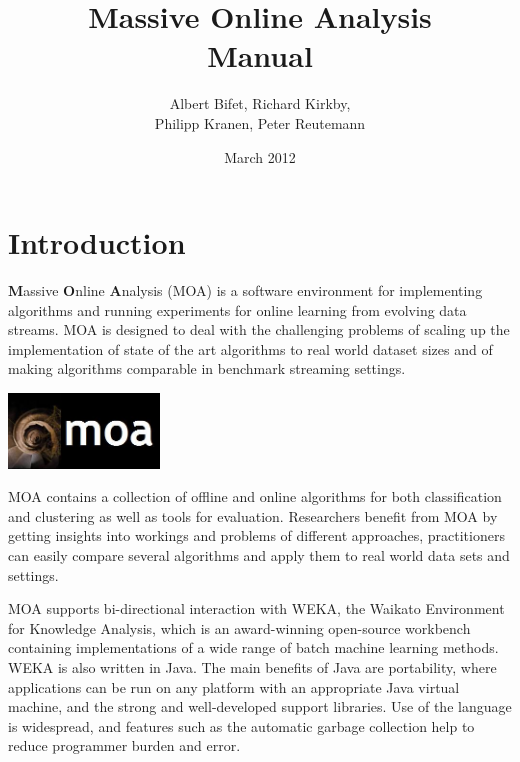 \documentclass[a4paper,12pt,twoside]{book}
\title{
\textbf{Massive Online Analysis}  \\ 
Manual
}
\author{Albert Bifet, Richard Kirkby, \\Philipp Kranen, Peter Reutemann }
\date{March 2012 }%
\begin{document}
\lstset{language=Java,basicstyle=\tiny,numbers=left}

\maketitle
{}
\thispagestyle{empty}
\cleardoublepage
\thispagestyle{empty}
\tableofcontents
\cleardoublepage
{}

\chapter{Introduction}

{\bf M}assive {\bf O}nline {\bf A}nalysis (MOA) 
is a software environment for implementing algorithms and running experiments for online learning from evolving data streams. 
MOA is designed to deal with the challenging problems of scaling up the implementation of state of the art algorithms to real 
world dataset sizes and of making algorithms comparable in benchmark streaming settings.

\begin{center}
\includegraphics[height=2cm]{images/LogoMOA.jpg} \end{center}

MOA contains a collection of offline 
and online algorithms for both classification and clustering as well as tools for evaluation.  
Researchers benefit from MOA by getting insights into workings and problems of different approaches, practitioners can 
easily compare several algorithms and apply them to real world data sets and settings. 

MOA supports bi-directional interaction
 with WEKA, the Waikato Environment for Knowledge Analysis, 
which is an award-winning open-source 
workbench containing implementations of a wide range of batch machine 
learning methods. WEKA is also written in Java. The main benefits
of Java are portability, where applications can be run on any platform with
an appropriate Java virtual machine, and the strong and well-developed support 
libraries. Use of the language is widespread, and features such as the
automatic garbage collection help to reduce programmer burden and error.
\end{document}
